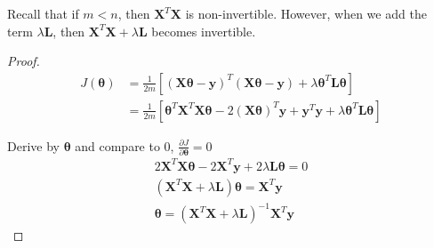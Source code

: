\begin{itemize}
    Recall that if $m<n$, then $\mathbf{X}^T\mathbf{X}$ is non-invertible. However, when we add the term $\lambda\mathbf{L}$, then $\mathbf{X}^T\mathbf{X} + \lambda\mathbf{L}$ becomes invertible.
    \begin{proof}
        \begin{equation}
            \begin{split}
                J(\mathbf{\theta}) &= \frac{1}{2m} \left[ \left(\mathbf{X}\mathbf{\theta}-\mathbf{y}\right)^{T}\left(\mathbf{X}\mathbf{\theta}-\mathbf{y}\right) + \lambda\mathbf{\theta}^T\mathbf{L}\mathbf{\theta} \right]\\
                                   &= \frac{1}{2m} \left[ \mathbf{\theta}^{T}\mathbf{X}^{T}\mathbf{X}\mathbf{\theta} - 2\left(\mathbf{X}\mathbf{\theta}\right)^{T}\mathbf{y} + \mathbf{y}^{T}\mathbf{y} + \lambda\mathbf{\theta}^T\mathbf{L}\mathbf{\theta} \right]
            \end{split}
        \end{equation}

        Derive by $\mathbf{\theta}$ and compare to 0, $\frac{\partial J}{\partial\mathbf{\theta}} = 0$
        \begin{equation}
            \begin{split}
                2\mathbf{X}^T\mathbf{X}\mathbf{\theta} - 2\mathbf{X}^T\mathbf{y} + 2\lambda\mathbf{L}\mathbf{\theta}= 0\\
                (\mathbf{X}^T\mathbf{X} + \lambda\mathbf{L})\mathbf{\theta} = \mathbf{X}^T\mathbf{y}\\
                \mathbf{\theta} = \left(\mathbf{X}^T\mathbf{X} + \lambda\mathbf{L}\right)^{-1}\mathbf{X}^T\mathbf{y}
            \end{split}
        \end{equation}
    \end{proof}
\end{itemize}


